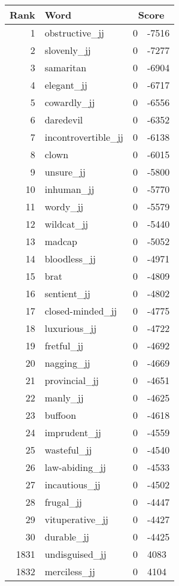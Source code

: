 \begin{longtable}[!htbp]{| rlr@{.}l |}
    \hline
    \textbf{Rank} & \textbf{Word} & \multicolumn{2}{c|}{\textbf{Score}} \\
    \hline
    \endhead
    1 & obstructive\_jj & 0 & -7516 \\
    2 & slovenly\_jj & 0 & -7277 \\
    3 & samaritan & 0 & -6904 \\
    4 & elegant\_jj & 0 & -6717 \\
    5 & cowardly\_jj & 0 & -6556 \\
    6 & daredevil & 0 & -6352 \\
    7 & incontrovertible\_jj & 0 & -6138 \\
    8 & clown & 0 & -6015 \\
    9 & unsure\_jj & 0 & -5800 \\
    10 & inhuman\_jj & 0 & -5770 \\
    11 & wordy\_jj & 0 & -5579 \\
    12 & wildcat\_jj & 0 & -5440 \\
    13 & madcap & 0 & -5052 \\
    14 & bloodless\_jj & 0 & -4971 \\
    15 & brat & 0 & -4809 \\
    16 & sentient\_jj & 0 & -4802 \\
    17 & closed-minded\_jj & 0 & -4775 \\
    18 & luxurious\_jj & 0 & -4722 \\
    19 & fretful\_jj & 0 & -4692 \\
    20 & nagging\_jj & 0 & -4669 \\
    21 & provincial\_jj & 0 & -4651 \\
    22 & manly\_jj & 0 & -4625 \\
    23 & buffoon & 0 & -4618 \\
    24 & imprudent\_jj & 0 & -4559 \\
    25 & wasteful\_jj & 0 & -4540 \\
    26 & law-abiding\_jj & 0 & -4533 \\
    27 & incautious\_jj & 0 & -4502 \\
    28 & frugal\_jj & 0 & -4447 \\
    29 & vituperative\_jj & 0 & -4427 \\
    30 & durable\_jj & 0 & -4425 \\
    1831 & undisguised\_jj & 0 & 4083 \\
    1832 & merciless\_jj & 0 & 4104 \\

\end{longtable}
